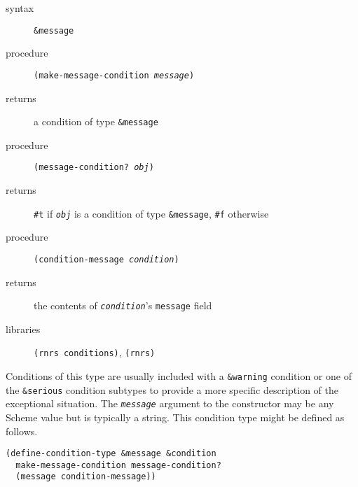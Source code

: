 \begin{description}

\label{exceptions_s24}\item[syntax] \texttt{\&{}message}



\item[procedure] \texttt{(make-message-condition \textit{message})}



\item[returns] a condition of type \texttt{\&{}message}


\item[procedure] \texttt{(message-condition? \textit{obj})}



\item[returns] \texttt{\#{}t} if \texttt{\textit{obj}} is a condition of type \texttt{\&{}message}, \texttt{\#{}f} otherwise


\item[procedure] \texttt{(condition-message \textit{condition})}



\item[returns] the contents of \texttt{\textit{condition}}'s \texttt{message} field


\item[libraries] \texttt{(rnrs conditions)}, \texttt{(rnrs)}
\end{description}



Conditions of this type are usually included with a \texttt{\&{}warning}
condition or one of the \texttt{\&{}serious} condition subtypes to provide a more
specific description of the exceptional situation.
The \texttt{\textit{message}} argument to the constructor may be any
Scheme value but is typically a string.
This condition type might be defined as follows.

\begin{alltt}
(define-condition-type \&{}message \&{}condition
  make-message-condition message-condition?
  (message condition-message))
\end{alltt}


